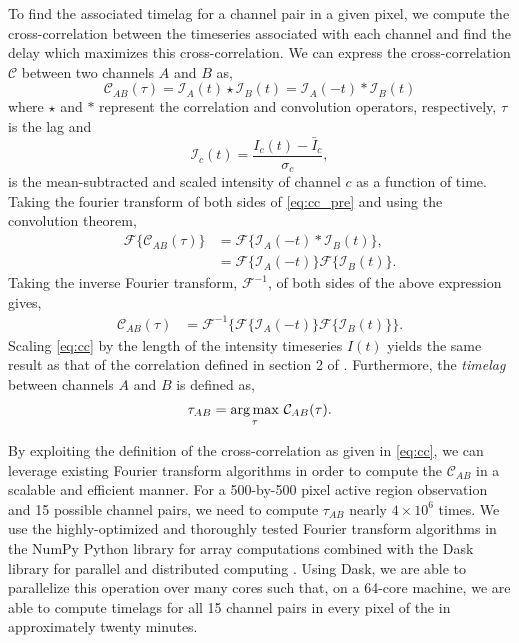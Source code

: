 To find the associated timelag for a channel pair in a given pixel, we compute the cross-correlation between the timeseries associated with each channel and find the delay which maximizes this cross-correlation. We can express the cross-correlation $\mathcal{C}$ between two channels $A$ and $B$ as,
\begin{equation}\label{eq:cc_pre}
    \mathcal{C}_{AB}(\tau) = \mathcal{I}_A(t)\star\mathcal{I}_B(t) = \mathcal{I}_A(-t)\ast\mathcal{I}_B(t)
\end{equation}
where $\star$ and $\ast$ represent the correlation and convolution operators, respectively, $\tau$ is the lag and
\begin{equation*}
    \mathcal{I}_c(t)=\frac{I_c(t)-\bar{I}_c}{\sigma_{c}},
\end{equation*}
is the mean-subtracted and scaled intensity of channel $c$ as a function of time. Taking the fourier transform of both sides of \autoref{eq:cc_pre} and using the convolution theorem,
\begin{align*}
    \mathcal{F}\{\mathcal{C}_{AB}(\tau)\} &= \mathcal{F}\{\mathcal{I}_A(-t)\ast\mathcal{I}_B(t)\},\\
    &= \mathcal{F}\{\mathcal{I}_A(-t)\}\mathcal{F}\{\mathcal{I}_B(t)\}.
\end{align*}
Taking the inverse Fourier transform, $\mathcal{F}^{-1}$, of both sides of the above expression gives,
\begin{align}\label{eq:cc}
    \mathcal{C}_{AB}(\tau) &= \mathcal{F}^{-1}\{\mathcal{F}\{\mathcal{I}_A(-t)\}\mathcal{F}\{\mathcal{I}_B(t)\}\}.
\end{align}
Scaling \autoref{eq:cc} by the length of the intensity timeseries $I(t)$ yields the same result as that of the correlation defined in section 2 of \citet{viall_evidence_2012}. Furthermore, the \textit{timelag} between channels $A$ and $B$ is defined as,
\begin{equation}\label{eq:timelag}
    \tau_{AB} = \argmax_{\tau}\,\mathcal{C}_{AB}(\tau).
\end{equation}

By exploiting the definition of the cross-correlation as given in \autoref{eq:cc}, we can leverage existing Fourier transform algorithms in order to compute the $\mathcal{C}_{AB}$ in a scalable and efficient manner. For a 500-by-500 pixel active region observation and 15 possible channel pairs, we need to compute $\tau_{AB}$ nearly $4\times10^6$ times. We use the highly-optimized and thoroughly tested Fourier transform algorithms in the NumPy Python library for array computations \citep{oliphant_guide_2006} combined with the Dask library for parallel and distributed computing \citep{dask_development_team_dask_2016}. Using Dask, we are able to parallelize this operation over many cores such that, on a 64-core machine, we are able to compute timelags for all 15 channel pairs in every pixel of the \AR{} in approximately twenty minutes.